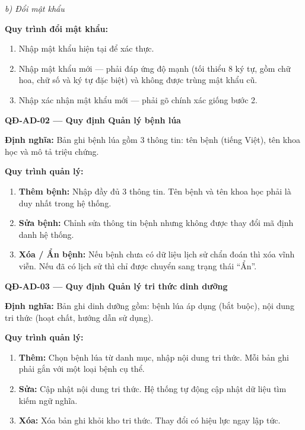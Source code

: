 ﻿\documentclass[12pt,a4paper]{article}
\begin{document}
\noindent\textit{b) Đổi mật khẩu}

\noindent\textbf{Quy trình đổi mật khẩu:}
\begin{enumerate}
    \item Nhập mật khẩu hiện tại để xác thực.
    \item Nhập mật khẩu mới --- phải đáp ứng độ mạnh (tối thiểu 8 ký tự, gồm chữ hoa, chữ số và ký tự đặc biệt) và không được trùng mật khẩu cũ.
    \item Nhập xác nhận mật khẩu mới --- phải gõ chính xác giống bước 2.
\end{enumerate}

\vspace{0.3cm}
\noindent\textbf{QĐ-AD-02 --- Quy định Quản lý bệnh lúa}

\noindent\textbf{Định nghĩa:} Bản ghi bệnh lúa gồm 3 thông tin: tên bệnh (tiếng Việt), tên khoa học và mô tả triệu chứng.

\noindent\textbf{Quy trình quản lý:}
\begin{enumerate}
    \item \textbf{Thêm bệnh:} Nhập đầy đủ 3 thông tin. Tên bệnh và tên khoa học phải là duy nhất trong hệ thống.
    \item \textbf{Sửa bệnh:} Chỉnh sửa thông tin bệnh nhưng không được thay đổi mã định danh hệ thống.
    \item \textbf{Xóa / Ẩn bệnh:} Nếu bệnh chưa có dữ liệu lịch sử chẩn đoán thì xóa vĩnh viễn. Nếu đã có lịch sử thì chỉ được chuyển sang trạng thái ``Ẩn''.
\end{enumerate}

\vspace{0.3cm}
\noindent\textbf{QĐ-AD-03 --- Quy định Quản lý tri thức dinh dưỡng}

\noindent\textbf{Định nghĩa:} Bản ghi dinh dưỡng gồm: bệnh lúa áp dụng (bắt buộc), nội dung tri thức (hoạt chất, hướng dẫn sử dụng).

\noindent\textbf{Quy trình quản lý:}
\begin{enumerate}
    \item \textbf{Thêm:} Chọn bệnh lúa từ danh mục, nhập nội dung tri thức. Mỗi bản ghi phải gắn với một loại bệnh cụ thể.
    \item \textbf{Sửa:} Cập nhật nội dung tri thức. Hệ thống tự động cập nhật dữ liệu tìm kiếm ngữ nghĩa.
    \item \textbf{Xóa:} Xóa bản ghi khỏi kho tri thức. Thay đổi có hiệu lực ngay lập tức.
\end{enumerate}
\end{document}
